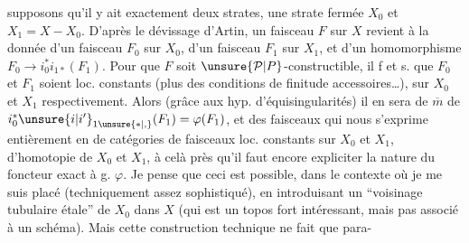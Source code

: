 supposons qu'il y ait exactement deux strates, une strate fermée $X_0$ et $X_1=X-X_0$. D'après le dévissage d'Artin, un faisceau $F$ sur $X$ revient à la donnée d'un faisceau $F_0$  sur $X_0$, d'un faisceau $F_1$  sur $X_1$, et d'un homomorphisme $F_0\longrightarrow i_0^*i_{1*}(F_1)$. Pour que $F$
{\reversemarginpar{}}%
soit $\unsure{\mathcal P|P}$-constructible, il f et s. que $F_0$ et $F_1$ soient loc. constants (plus des conditions de finitude accessoires\ldots), sur $X_0$ et $X_1$ respectivement. Alors (grâce aux hyp. d'équisingularités) il en sera de $\overline m$ de $i_0^*\unsure{i|i'}_{1\unsure{*|,}}(F_1)=\varphi(F_1)$, et  des faisceaux qui nous  s'exprime entièrement en   de catégories de faisceaux loc. constants sur $X_0$ et $X_1$,   d'homotopie de $X_0$ et $X_1$, à celà près qu'il faut encore expliciter la nature du foncteur exact à g. $\varphi$. Je pense que ceci est possible, dans le contexte  où je me suis placé (techniquement assez sophistiqué), en introduisant un ``voisinage tubulaire étale'' de $X_0$ dans $X$ (qui est un topos fort intéressant, mais pas associé à un schéma). Mais cette construction technique ne fait que para-%
